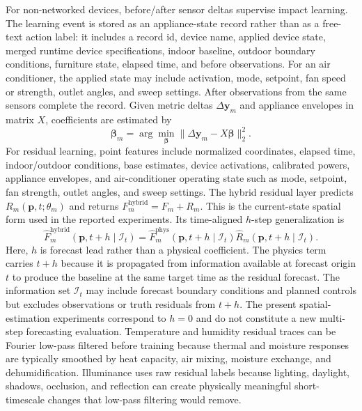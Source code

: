 \documentclass[conference,a4paper]{IEEEtran}
\begin{document}
For non-networked devices, before/after sensor deltas supervise impact learning. The learning event is stored as an appliance-state record rather than as a free-text action label: it includes a record id, device name, applied device state, merged runtime device specifications, indoor baseline, outdoor boundary conditions, furniture state, elapsed time, and before observations. For an air conditioner, the applied state may include activation, mode, setpoint, fan speed or strength, outlet angles, and sweep settings. After observations from the same sensors complete the record. Given metric deltas $\Delta\mathbf{y}_m$ and appliance envelopes in matrix $X$, coefficients are estimated by
\begin{equation}
\boldsymbol{\beta}_m=\arg\min_{\boldsymbol{\beta}}\|\Delta\mathbf{y}_m-X\boldsymbol{\beta}\|_2^2.
\end{equation}
For residual learning, point features include normalized coordinates, elapsed time, indoor/outdoor conditions, base estimates, device activations, calibrated powers, appliance envelopes, and air-conditioner operating state such as mode, setpoint, fan strength, outlet angles, and sweep settings. The hybrid residual layer predicts $R_m(\mathbf{p},t;\theta_m)$ and returns $F_m^{\mathrm{hybrid}}=F_m+R_m$. This is the current-state spatial form used in the reported experiments. Its time-aligned $h$-step generalization is
\begin{equation}
\widehat F_m^{\mathrm{hybrid}}(\mathbf{p},t+h\mid\mathcal{I}_t)
=\widehat F_m^{\mathrm{phys}}(\mathbf{p},t+h\mid\mathcal{I}_t)
\widehat R_m(\mathbf{p},t+h\mid\mathcal{I}_t).
\end{equation}
Here, $h$ is forecast lead rather than a physical coefficient. The physics term carries $t+h$ because it is propagated from information available at forecast origin $t$ to produce the baseline at the same target time as the residual forecast. The information set $\mathcal{I}_t$ may include forecast boundary conditions and planned controls but excludes observations or truth residuals from $t+h$. The present spatial-estimation experiments correspond to $h=0$ and do not constitute a new multi-step forecasting evaluation. Temperature and humidity residual traces can be Fourier low-pass filtered before training because thermal and moisture responses are typically smoothed by heat capacity, air mixing, moisture exchange, and dehumidification. Illuminance uses raw residual labels because lighting, daylight, shadows, occlusion, and reflection can create physically meaningful short-timescale changes that low-pass filtering would remove.
\end{document}
